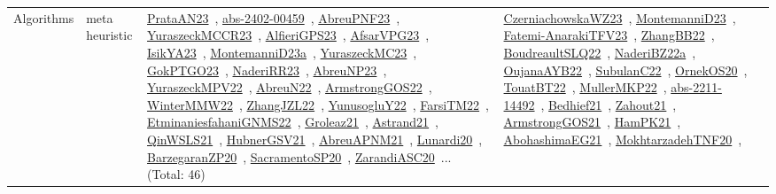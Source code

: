 {\begin{longtable}{lp{3cm}>{\raggedright\arraybackslash}p{6cm}>{\raggedright\arraybackslash}p{6cm}>{\raggedright\arraybackslash}p{8cm}}
Algorithms & meta heuristic & \href{../works/PrataAN23.pdf}{PrataAN23}~\cite{PrataAN23}, \href{../works/abs-2402-00459.pdf}{abs-2402-00459}~\cite{abs-2402-00459}, \href{../works/AbreuPNF23.pdf}{AbreuPNF23}~\cite{AbreuPNF23}, \href{../works/YuraszeckMCCR23.pdf}{YuraszeckMCCR23}~\cite{YuraszeckMCCR23}, \href{../works/AlfieriGPS23.pdf}{AlfieriGPS23}~\cite{AlfieriGPS23}, \href{../works/AfsarVPG23.pdf}{AfsarVPG23}~\cite{AfsarVPG23}, \href{../works/IsikYA23.pdf}{IsikYA23}~\cite{IsikYA23}, \href{../works/MontemanniD23a.pdf}{MontemanniD23a}~\cite{MontemanniD23a}, \href{../works/YuraszeckMC23.pdf}{YuraszeckMC23}~\cite{YuraszeckMC23}, \href{../works/GokPTGO23.pdf}{GokPTGO23}~\cite{GokPTGO23}, \href{../works/NaderiRR23.pdf}{NaderiRR23}~\cite{NaderiRR23}, \href{../works/AbreuNP23.pdf}{AbreuNP23}~\cite{AbreuNP23}, \href{../works/YuraszeckMPV22.pdf}{YuraszeckMPV22}~\cite{YuraszeckMPV22}, \href{../works/AbreuN22.pdf}{AbreuN22}~\cite{AbreuN22}, \href{../works/ArmstrongGOS22.pdf}{ArmstrongGOS22}~\cite{ArmstrongGOS22}, \href{../works/WinterMMW22.pdf}{WinterMMW22}~\cite{WinterMMW22}, \href{../works/ZhangJZL22.pdf}{ZhangJZL22}~\cite{ZhangJZL22}, \href{../works/YunusogluY22.pdf}{YunusogluY22}~\cite{YunusogluY22}, \href{../works/FarsiTM22.pdf}{FarsiTM22}~\cite{FarsiTM22}, \href{../works/EtminaniesfahaniGNMS22.pdf}{EtminaniesfahaniGNMS22}~\cite{EtminaniesfahaniGNMS22}, \href{../works/Groleaz21.pdf}{Groleaz21}~\cite{Groleaz21}, \href{../works/Astrand21.pdf}{Astrand21}~\cite{Astrand21}, \href{../works/QinWSLS21.pdf}{QinWSLS21}~\cite{QinWSLS21}, \href{../works/HubnerGSV21.pdf}{HubnerGSV21}~\cite{HubnerGSV21}, \href{../works/AbreuAPNM21.pdf}{AbreuAPNM21}~\cite{AbreuAPNM21}, \href{../works/Lunardi20.pdf}{Lunardi20}~\cite{Lunardi20}, \href{../works/BarzegaranZP20.pdf}{BarzegaranZP20}~\cite{BarzegaranZP20}, \href{../works/SacramentoSP20.pdf}{SacramentoSP20}~\cite{SacramentoSP20}, \href{../works/ZarandiASC20.pdf}{ZarandiASC20}~\cite{ZarandiASC20}... (Total: 46) & \href{../works/CzerniachowskaWZ23.pdf}{CzerniachowskaWZ23}~\cite{CzerniachowskaWZ23}, \href{../works/MontemanniD23.pdf}{MontemanniD23}~\cite{MontemanniD23}, \href{../works/Fatemi-AnarakiTFV23.pdf}{Fatemi-AnarakiTFV23}~\cite{Fatemi-AnarakiTFV23}, \href{../works/ZhangBB22.pdf}{ZhangBB22}~\cite{ZhangBB22}, \href{../works/BoudreaultSLQ22.pdf}{BoudreaultSLQ22}~\cite{BoudreaultSLQ22}, \href{../works/NaderiBZ22a.pdf}{NaderiBZ22a}~\cite{NaderiBZ22a}, \href{../works/OujanaAYB22.pdf}{OujanaAYB22}~\cite{OujanaAYB22}, \href{../works/SubulanC22.pdf}{SubulanC22}~\cite{SubulanC22}, \href{../works/OrnekOS20.pdf}{OrnekOS20}~\cite{OrnekOS20}, \href{../works/TouatBT22.pdf}{TouatBT22}~\cite{TouatBT22}, \href{../works/MullerMKP22.pdf}{MullerMKP22}~\cite{MullerMKP22}, \href{../works/abs-2211-14492.pdf}{abs-2211-14492}~\cite{abs-2211-14492}, \href{../works/Bedhief21.pdf}{Bedhief21}~\cite{Bedhief21}, \href{../works/Zahout21.pdf}{Zahout21}~\cite{Zahout21}, \href{../works/ArmstrongGOS21.pdf}{ArmstrongGOS21}~\cite{ArmstrongGOS21}, \href{../works/HamPK21.pdf}{HamPK21}~\cite{HamPK21}, \href{../works/AbohashimaEG21.pdf}{AbohashimaEG21}~\cite{AbohashimaEG21}, \href{../works/MokhtarzadehTNF20.pdf}{MokhtarzadehTNF20}~\cite{MokhtarzadehTNF20}, 
\end{longtable}}
